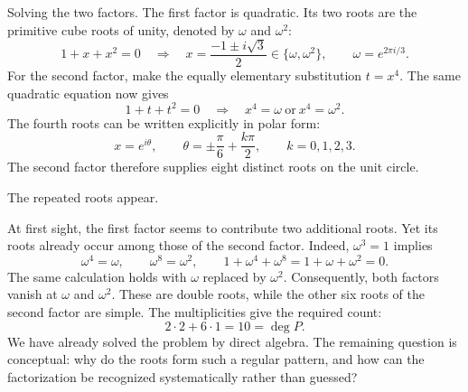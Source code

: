 \documentclass[11pt,aspectratio=169]{beamer}
\newcommand{\slidebody}{%
  \fontsize{10.6}{12.8}\selectfont\justifying%
  \setlength{\parskip}{4.2pt}%
  \setlength{\abovedisplayskip}{4pt}%
  \setlength{\belowdisplayskip}{4pt}%
  \setlength{\abovedisplayshortskip}{2pt}%
  \setlength{\belowdisplayshortskip}{2.5pt}%
}
\newcommand{\tightbody}{\slidebody\fontsize{10.2}{12.3}\selectfont\setlength{\parskip}{3pt}}
\begin{document}
\begin{frame}[t]{Solving the two factors.}
\tightbody
The first factor is quadratic. Its two roots are the primitive cube roots of unity, denoted by $\omega$ and $\omega^2$:
\begin{equation}\label{eq:quadratic}
  1+x+x^2=0
  \quad\Longrightarrow\quad
  x=\frac{-1\pm i\sqrt{3}}{2}\in\{\omega,\omega^2\},
  \qquad \omega=e^{2\pi i/3}.
\end{equation}
For the second factor, make the equally elementary substitution $t=x^4$. The same quadratic equation now gives
\begin{equation}\label{eq:t-substitution}
  1+t+t^2=0
  \quad\Longrightarrow\quad
  x^4=\omega\ \text{or}\ x^4=\omega^2.
\end{equation}
The fourth roots can be written explicitly in polar form:
\begin{equation}\label{eq:ansatz-roots}
  x=e^{i\theta},\qquad
  \theta=\pm\frac{\pi}{6}+\frac{k\pi}{2},\qquad k=0,1,2,3.
\end{equation}
The second factor therefore supplies eight distinct roots on the unit circle.
\end{frame}

\begin{frame}[t]{The repeated roots appear.}
\slidebody
At first sight, the first factor seems to contribute two additional roots. Yet its roots already occur among those of the second factor. Indeed, $\omega^3=1$ implies
\begin{equation}\label{eq:omega-powers}
  \omega^4=\omega,\qquad \omega^8=\omega^2,
  \qquad 1+\omega^4+\omega^8=1+\omega+\omega^2=0.
\end{equation}
The same calculation holds with $\omega$ replaced by $\omega^2$. Consequently, both factors vanish at $\omega$ and $\omega^2$. These are double roots, while the other six roots of the second factor are simple. The multiplicities give the required count:
\begin{equation}\label{eq:count-early}
  2\cdot 2+6\cdot 1=10=\deg P.
\end{equation}
We have already solved the problem by direct algebra. The remaining question is conceptual: why do the roots form such a regular pattern, and how can the factorization be recognized systematically rather than guessed?
\end{frame}
\end{document}
